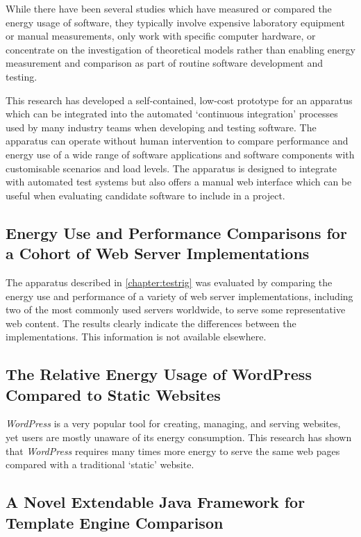 While there have been several studies which have measured or compared the energy usage of software, they typically involve expensive laboratory equipment or manual measurements, only work with specific computer hardware, or concentrate on the investigation of theoretical models rather than enabling energy measurement and comparison as part of routine software development and testing.

This research has developed a self-contained, low-cost prototype for an apparatus which can be integrated into the automated `continuous integration' processes used by many industry teams when developing and testing software. The apparatus can operate without human intervention to compare performance and energy use of a wide range of software applications and software components  with customisable scenarios and load levels. The apparatus is designed to integrate with automated test systems but also offers a manual web interface which can be useful when evaluating candidate software to include in a project.

\subsection{Energy Use and Performance Comparisons for a Cohort of Web Server Implementations}
\label{contrib:servers}

The apparatus described in \autoref{chapter:testrig} was evaluated by comparing the energy use and performance of a variety of web server implementations, including two of the most commonly used servers worldwide, to serve some representative web content. The results clearly indicate the differences between the implementations. This information is not available elsewhere.

\subsection{The Relative Energy Usage of WordPress Compared to Static Websites}
\label{contrib:wordpress}

\emph{WordPress} is a very popular tool for creating, managing, and serving websites, yet users are mostly unaware of its energy consumption. This research has shown that \emph{WordPress} requires many times more energy to serve the same web pages compared with a traditional `static' website.

\subsection{A Novel Extendable Java Framework for Template Engine Comparison}
\label{contrib:framework}

